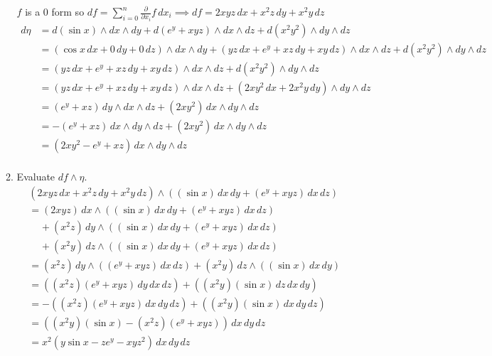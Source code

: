 \documentclass{article}
\newcommand{\parti}[1]{\frac{\partial}{\partial #1}}
\begin{document}
\begin{enumerate}
\begin{enumerate}
            $f$ is a 0 form so  $\displaystyle df = \sum_{i=0}^n \parti{x_i}f\, dx_i \implies df = 2xyz \, dx + x^2z \, dy + x^2y \, dz$
            \begin{align*} 
                d\eta &= d(\sin x) \wedge dx \wedge dy + d(e^y + xyz) \wedge dx \wedge dz + d(x^2y^2) \wedge dy \wedge dz \\
                &= (\cos x \, dx + 0 \, dy + 0 \, dz) \wedge dx \wedge dy + (yz \, dx + e^y + xz \, dy + xy \, dz) \wedge dx \wedge dz + d(x^2y^2) \wedge dy \wedge dz \\
                &=  (yz \, dx + e^y + xz \, dy + xy \, dz) \wedge dx \wedge dz + d(x^2y^2) \wedge dy \wedge dz \\
                &=  (yz \, dx + e^y + xz \, dy + xy \, dz) \wedge dx \wedge dz + (2xy^2 \, dx + 2x^2y \, dy) \wedge dy \wedge dz \\
                &= (e^y + xz) \, dy \wedge dx \wedge dz + (2xy^2) \, dx \wedge dy \wedge dz \\
                &= -(e^y + xz) \, dx \wedge dy \wedge dz + (2xy^2) \, dx \wedge dy \wedge dz \\
                &= (2xy^2 - e^y + xz) \, dx \wedge dy \wedge dz \\
            \end{align*} 
        \item Evaluate $df \wedge \eta$.
            \begin{align*} 
                & (2xyz \, dx + x^2z \, dy + x^2y \, dz) \wedge ((\sin x) \, dx \, dy + (e^y + xyz) \, dx \, dz) \\
                &= (2xyz) \, dx \wedge ((\sin x) \, dx \, dy + (e^y + xyz) \, dx \, dz) \\
                & \; \; \; \; + (x^2z) \, dy \wedge ((\sin x) \, dx \, dy + (e^y + xyz) \, dx \, dz) \\
                & \; \; \; \; + (x^2y) \, dz \wedge ((\sin x) \, dx \, dy + (e^y + xyz) \, dx \, dz) \\
                & = (x^2z) \, dy \wedge ((e^y + xyz) \, dx \, dz) + (x^2y) \, dz \wedge ((\sin x) \, dx \, dy) \\
                & = ((x^2z)(e^y + xyz) \, dy \, dx \, dz) + ((x^2y) (\sin x) \, dz \, dx \, dy) \\
                & = -((x^2z)(e^y + xyz) \, dx \, dy \, dz) + ((x^2y) (\sin x) \, dx \, dy \, dz ) \\
                & = ((x^2y)(\sin x) - (x^2z)(e^y + xyz)) \, dx \, dy \, dz \\
                & = x^2(y\sin x - ze^y - xyz^2) \, dx \, dy \, dz \\
            \end{align*} 

    \end{enumerate} 
\end{enumerate}
\newpage
\end{document}

